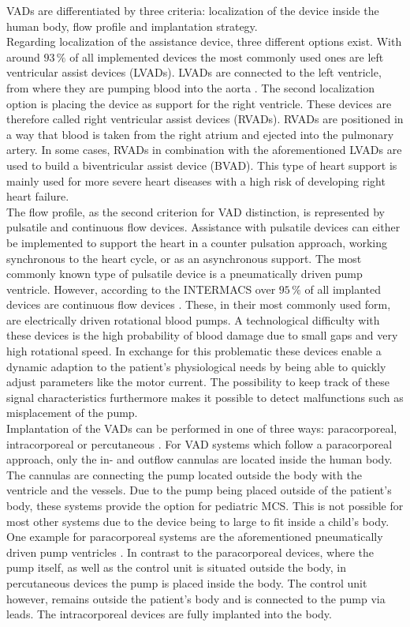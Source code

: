 VADs are differentiated by three criteria: localization of the device inside the human body, flow profile and implantation strategy.
\\Regarding localization of the assistance device, three different options exist. With around $93\, \%$ of all implemented devices the most commonly used ones are left ventricular assist devices (LVADs). \cite{VAD7} LVADs are connected to the left ventricle, from where they are pumping blood into the aorta \cite{VAD4}. The second localization option is placing the device as support for the right ventricle. These devices are therefore called right ventricular assist devices (RVADs). RVADs are positioned in a way that blood is taken from the right atrium and ejected into the pulmonary artery. \cite{VAD7} In some cases, RVADs in combination with the aforementioned LVADs are used to build a biventricular assist device (BVAD). This type of heart support is mainly used for more severe heart diseases with a high risk of developing right heart failure. \cite{VAD11}
\\The flow profile, as the second criterion for VAD distinction, is represented by pulsatile and continuous flow devices. Assistance with pulsatile devices can either be implemented to support the heart in a counter pulsation approach, working synchronous to the heart cycle, or as an asynchronous support. The most commonly known type of pulsatile device is a pneumatically driven pump ventricle. \cite{VAD1}
However, according to the INTERMACS over $95\, \%$ of all implanted devices are continuous flow devices \cite{VAD8}. These, in their most commonly used form, are electrically driven rotational blood pumps. A technological difficulty with these devices is the high probability of blood damage due to small gaps and very high rotational speed. In exchange for this problematic these devices enable a dynamic adaption to the patient's physiological needs by being able to quickly adjust parameters like the motor current. The possibility to keep track of these signal characteristics furthermore makes it possible to detect malfunctions such as misplacement of the pump. \cite{VAD1}
\\Implantation of the VADs can be performed in one of three ways: paracorporeal, intracorporeal or percutaneous \cite{VAD7}. For VAD systems which follow a paracorporeal approach, only the in- and outflow cannulas are located inside the human body. The cannulas are connecting the pump located outside the body with the ventricle and the vessels. Due to the pump being placed outside of the patient's body, these systems provide the option for pediatric MCS. This is not possible for most other systems due to the device being to large to fit inside a child's body. \cite{VAD10} One example for paracorporeal systems are the aforementioned pneumatically driven pump ventricles \cite{VAD1}. In contrast to the paracorporeal devices, where the pump itself, as well as the control unit is situated outside the body, in percutaneous devices the pump is placed inside the body. The control unit however, remains outside the patient's body and is connected to the pump via leads. The intracorporeal devices are fully implanted into the body. \cite{VAD10}
